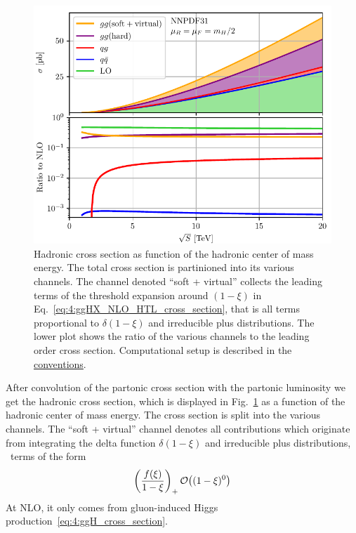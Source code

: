 \begin{figure}[h]
\centering
\includegraphics[width=\figurewidth]{Images/channel_comparison_HTL_NLO.pdf}
\caption{Hadronic cross section as function of the hadronic center of mass energy. The total cross section is partinioned into its various channels. The channel denoted ``soft + virtual'' collects the leading terms of the threshold expansion around $(1 - \xi)$ in Eq.~\eqref{eq:4:ggHX_NLO_HTL_cross_section}, that is all terms proportional to $\delta (1 - \xi)$ and irreducible plus distributions. The lower plot shows the ratio of the various channels to the leading order cross section. Computational setup is described in the \hyperref[chap:notation_and_conventions]{conventions}.}
\label{fig:4:channel_comparison}
\end{figure}
After convolution of the partonic cross section with the partonic luminosity we get the hadronic cross section, which is displayed in Fig.~\ref{fig:4:channel_comparison} as a function of the hadronic center of mass energy. The cross section is split into the various channels. The ``soft + virtual'' channel denotes all contributions which originate from integrating the delta function $\delta (1 - \xi)$ and irreducible plus distributions, \ie\ terms of the form
\begin{equation}
\left(\frac{f(\xi)}{1 - \xi} \right)_+ \mathcal{O}\!\left((1 - \xi)^0\right)
\end{equation}
At \acs{NLO}, it only comes from gluon-induced Higgs production~\eqref{eq:4:ggH_cross_section}.


